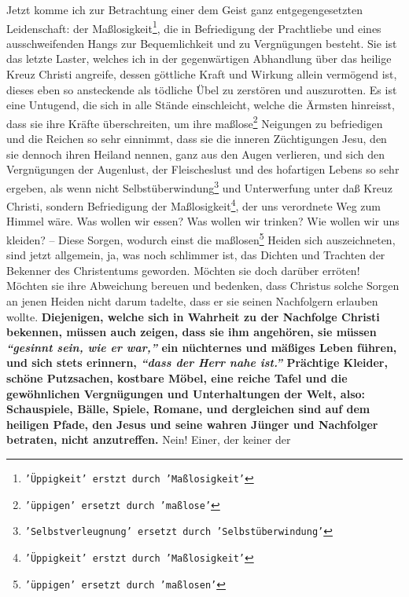Jetzt komme ich zur Betrachtung einer dem Geist ganz entgegengesetzten
Leidenschaft: der Maßlosigkeit\footnote{\texttt{'Üppigkeit' erstzt durch
'Maßlosigkeit'}}, die in Befriedigung der Prachtliebe und
eines
ausschweifenden Hangs zur
Bequemlichkeit und zu Vergnügungen
besteht. Sie ist
das letzte Laster, welches ich in der gegenwärtigen Abhandlung
über das heilige
Kreuz Christi angreife, dessen göttliche Kraft und Wirkung allein vermögend ist,
dieses eben so ansteckende als tödliche Übel zu
zerstören und auszurotten. Es
ist eine Untugend, die sich in alle Stände einschleicht, welche
die Ärmsten
hinreisst, dass sie ihre Kräfte überschreiten, um ihre
maßlose\footnote{\texttt{'üppigen' ersetzt durch 'maßlose'}} Neigungen zu
befriedigen und die Reichen so sehr einnimmt, dass sie die inneren Züchtigungen
Jesu, den sie dennoch ihren
Heiland nennen, ganz aus den Augen verlieren, und sich
den Vergnügungen der Augenlust, der
Fleischeslust und des
hofartigen Lebens so
sehr ergeben, als wenn nicht
Selbstüberwindung\footnote{\texttt{'Selbstverleugnung' ersetzt
durch 'Selbstüberwindung'}}
 und Unterwerfung
unter daß Kreuz
Christi, sondern Befriedigung der Maßlosigkeit\footnote{\texttt{'Üppigkeit'
erstzt durch 'Maßlosigkeit'}},
der uns verordnete Weg zum Himmel
wäre. Was wollen wir essen? Was wollen wir trinken? Wie wollen wir uns kleiden?
-- Diese Sorgen, wodurch einst die maßlosen\footnote{\texttt{'üppigen' ersetzt
durch 'maßlosen'}}
Heiden sich auszeichneten, sind jetzt
allgemein, ja, was noch schlimmer ist, das Dichten und Trachten
der Bekenner des
Christentums geworden. Möchten sie doch darüber erröten! Möchten sie ihre
Abweichung bereuen und bedenken, dass Christus solche
Sorgen an jenen Heiden
nicht darum tadelte, dass er sie seinen Nachfolgern erlauben wollte.
\label{ref:14_01_wahre_nachfolger} \textbf{Diejenigen,
welche sich in Wahrheit zu der Nachfolge Christi bekennen, müssen auch zeigen,
dass sie ihm angehören, sie müssen
\textit{"`gesinnt sein, wie er war,"'} ein nüchternes
und mäßiges Leben führen, und sich stets erinnern,
\textit{"`dass der Herr nahe ist."'}
Prächtige Kleider, schöne Putzsachen, kostbare
Möbel,
eine reiche Tafel und die
gewöhnlichen Vergnügungen und
Unterhaltungen der Welt,
also: Schauspiele, Bälle,
Spiele, Romane, und dergleichen sind auf dem
heiligen Pfade,
den Jesus und seine wahren
Jünger und Nachfolger betraten, nicht anzutreffen.} Nein! Einer, der keiner der
